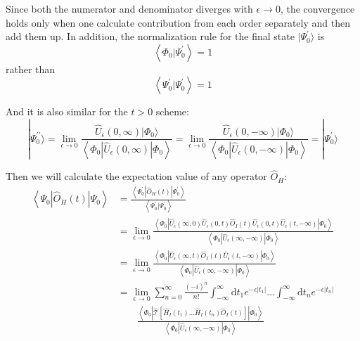 Since both the numerator and denominator diverges with $\epsilon \rightarrow 0$, the convergence holds only when one calculate contribution from each order separately and then add them up.
In addition, the normalization rule for the final state $| \Psi_{0}^{\prime}\rangle$ is 
\begin{equation}
\left\langle\Phi_{0} | \Psi_{0}^{\prime}\right\rangle= 1
\end{equation}
rather than
\begin{equation}
\left\langle\Psi_{0}^{\prime} | \Psi_{0}^{\prime}\right\rangle= 1
\end{equation}

And it is also similar for the $t>0$ scheme:
\begin{equation}
| \Psi_{0}^{\prime \prime} \rangle=\lim _{\epsilon \rightarrow 0} \frac{\hat{U}_{\epsilon}(0, \infty) | \Phi_{0} \rangle}{\left\langle\Phi_{0}\left|\hat{U}_{\epsilon}(0, \infty)\right| \Phi_{0}\right\rangle}=\lim _{\epsilon \rightarrow 0} \frac{\hat{U}_{\epsilon}(0,-\infty) | \Phi_{0} \rangle}{\left\langle\Phi_{0}\left|\hat{U}_{\epsilon}(0,-\infty)\right| \Phi_{0}\right\rangle}=| \Psi_{0}^{\prime} \rangle
\end{equation}

Then we will calculate the expectation value of any operator $\hat{O}_H$:
\begin{equation}
\begin{aligned}
	\left\langle\Psi_{0}\left|\hat{O}_{H}(t)\right| \Psi_{0}\right\rangle 
	&=\frac{\left\langle\Psi_{0}^{\prime}\left|\hat{O}_{H}(t)\right| \Psi_{0}^{\prime}\right\rangle}
	{\left\langle\Psi_{0}^{\prime} | \Psi_{0}^{\prime}\right\rangle}
	\\
	&=\lim _{\epsilon \rightarrow 0} 
	\frac{\left\langle\Phi_{0}\left|\hat{U}_{\epsilon}(\infty, 0)\hat{U}_{\epsilon}(0, t) \hat{O}_{I}(t) \hat{U}_{\epsilon}(0, t)\hat{U}_{\epsilon}(t,-\infty)\right| \Phi_{0}\right\rangle}
	{\left\langle\Phi_{0}\left|\hat{U}_{\epsilon}(\infty,-\infty)\right| \Phi_{0}\right\rangle}
	\\
	&=\lim _{\epsilon \rightarrow 0} 
	\frac{\left\langle\Phi_{0}\left|\hat{U}_{\epsilon}(\infty, t) \hat{O}_{I}(t) \hat{U}_{\epsilon}(t,-\infty)\right| \Phi_{0}\right\rangle}
	{\left\langle\Phi_{0}\left|\hat{U}_{\epsilon}(\infty,-\infty)\right| \Phi_{0}\right\rangle}
	\\
	&=\lim _{\epsilon \rightarrow 0} \sum_{n=0}^{\infty} \frac{(-i)^{n}}{n !} \int_{-\infty}^{\infty} \mathrm{d} t_{1} e^{-\epsilon\left|t_{1}\right|} \ldots \int_{-\infty}^{\infty} \mathrm{d} t_{n} e^{-\epsilon\left|t_{n}\right|}
	\\
	&\qquad \frac{\left\langle\Phi_{0}\left|
	\hat{\mathcal{T}}\left[\hat{H}_{I}\left(t_{1}\right) \ldots \hat{H}_{I}\left(t_{n}\right) \hat{O}_{I}(t)\right]\right|
	\Phi_{0}\right\rangle}
	{\left\langle\Phi_{0}\left|\hat{U}_{\epsilon}(\infty,-\infty)\right| \Phi_{0}\right\rangle}
\end{aligned}
\end{equation}

